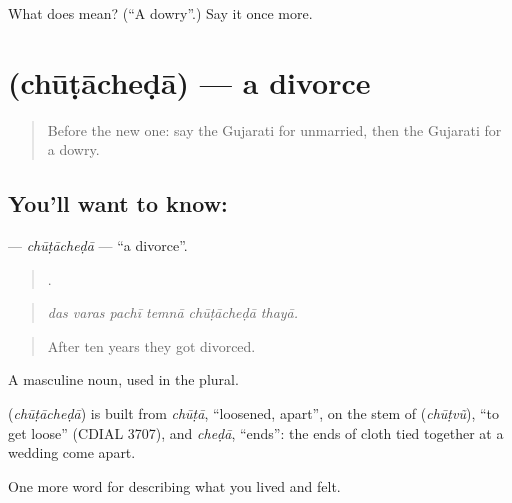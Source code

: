 \begin{tcolorbox}[breakable,colback=teal!4,colframe=teal!35!black,title={Before you move on}]
What does  mean? (\textquotedblleft{}A dowry\textquotedblright{}.) Say it once more.
\end{tcolorbox}
\section[\texorpdfstring{\gu{છૂટાછેડા} (chūṭācheḍā)}{છૂટાછેડા (chūṭācheḍā)}]{ (chūṭācheḍā) — a divorce}

\label{lesson:GU-C498-chutacheda}



\begin{quote}
Before the new one: say the Gujarati for unmarried, then the Gujarati for a dowry.
\end{quote}

\subsection*{You'll want to know: }
\textbf{} — \emph{chūṭācheḍā} — \textquotedblleft{}a divorce\textquotedblright{}.

\begin{quote}
     .
\end{quote}

\begin{quote}
\emph{das varas pachī temnā chūṭācheḍā thayā.}
\end{quote}

\begin{quote}
After ten years they got divorced.
\end{quote}

A masculine noun, used in the plural.

\begin{cousinweb}
\textbf{} (\emph{chūṭācheḍā}) is built from \emph{chūṭā}, \textquotedblleft{}loosened, apart\textquotedblright{}, on the stem of \textbf{} (\emph{chūṭvũ}), \textquotedblleft{}to get loose\textquotedblright{} (CDIAL 3707), and \emph{cheḍā}, \textquotedblleft{}ends\textquotedblright{}: the ends of cloth tied together at a wedding come apart.
\end{cousinweb}

\begin{grammarlens}[title={What you've built}]
One more word for describing what you lived and felt.
\end{grammarlens}

